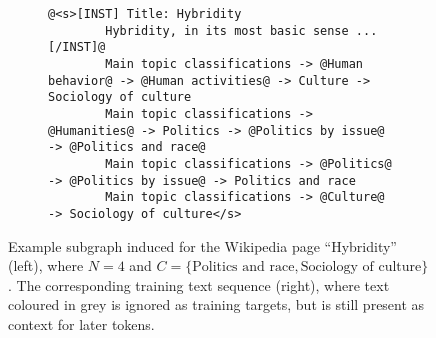 \begin{figure}[t]
    \centering
    \begin{subfigure}[c]{0.45\textwidth}
        \centering
    \end{subfigure}%
    \hfill
    \begin{adjustbox}{varwidth=\linewidth,fbox}
        \begin{subfigure}[c]{0.5\textwidth}
            \centering
            \begin{lstlisting}[gobble=8,style=prompt]
        @<s>[INST] Title: Hybridity
        Hybridity, in its most basic sense ... [/INST]@
        Main topic classifications -> @Human behavior@ -> @Human activities@ -> Culture -> Sociology of culture
        Main topic classifications -> @Humanities@ -> Politics -> @Politics by issue@ -> @Politics and race@
        Main topic classifications -> @Politics@ -> @Politics by issue@ -> Politics and race
        Main topic classifications -> @Culture@ -> Sociology of culture</s>
        \end{lstlisting}
        \end{subfigure}
    \end{adjustbox}
    \caption{Example subgraph induced for the Wikipedia page ``Hybridity'' (left), where $N = 4$ and $C = \{\text{Politics and race}, \text{Sociology of culture}\}$.
        The corresponding training text sequence (right), where text coloured in grey is ignored as training targets, but is still present as context for later tokens.}
    \label{fig:prompt-example}
\end{figure}